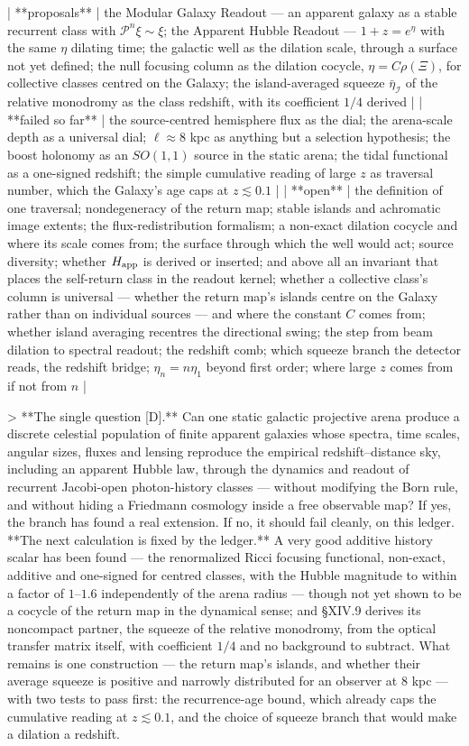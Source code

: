 | **proposals** | the Modular Galaxy Readout — an apparent galaxy as a stable recurrent class with $\mathscr P^n\xi\sim\xi$; the Apparent Hubble Readout — $1+z = e^{\eta}$ with the same $\eta$ dilating time; the galactic well as the dilation scale, through a surface not yet defined; the null focusing column as the dilation cocycle, $\eta = C\rho(\Xi)$, for collective classes centred on the Galaxy; the island-averaged squeeze $\bar\eta_{\mathcal I}$ of the relative monodromy as the class redshift, with its coefficient $1/4$ derived |
| **failed so far** | the source-centred hemisphere flux as the dial; the arena-scale depth as a universal dial; $\ell\approx8$ kpc as anything but a selection hypothesis; the boost holonomy as an $SO(1,1)$ source in the static arena; the tidal functional as a one-signed redshift; the simple cumulative reading of large $z$ as traversal number, which the Galaxy's age caps at $z\lesssim0.1$ |
| **open** | the definition of one traversal; nondegeneracy of the return map; stable islands and achromatic image extents; the flux-redistribution formalism; a non-exact dilation cocycle and where its scale comes from; the surface through which the well would act; source diversity; whether $H_{\rm app}$ is derived or inserted; and above all an invariant that places the self-return class in the readout kernel; whether a collective class's column is universal — whether the return map's islands centre on the Galaxy rather than on individual sources — and where the constant $C$ comes from; whether island averaging recentres the directional swing; the step from beam dilation to spectral readout; the redshift comb; which squeeze branch the detector reads, the redshift bridge; $\eta_n = n\eta_1$ beyond first order; where large $z$ comes from if not from $n$ |

> **The single question [D].** Can one static galactic projective arena produce a discrete celestial population of finite apparent galaxies whose spectra, time scales, angular sizes, fluxes and lensing reproduce the empirical redshift–distance sky, including an apparent Hubble law, through the dynamics and readout of recurrent Jacobi-open photon-history classes — without modifying the Born rule, and without hiding a Friedmann cosmology inside a free observable map? If yes, the branch has found a real extension. If no, it should fail cleanly, on this ledger. **The next calculation is fixed by the ledger.** A very good additive history scalar has been found — the renormalized Ricci focusing functional, non-exact, additive and one-signed for centred classes, with the Hubble magnitude to within a factor of $1$–$1.6$ independently of the arena radius — though not yet shown to be a cocycle of the return map in the dynamical sense; and §XIV.9 derives its noncompact partner, the squeeze of the relative monodromy, from the optical transfer matrix itself, with coefficient $1/4$ and no background to subtract. What remains is one construction — the return map's islands, and whether their average squeeze is positive and narrowly distributed for an observer at $8$ kpc — with two tests to pass first: the recurrence-age bound, which already caps the cumulative reading at $z\lesssim0.1$, and the choice of squeeze branch that would make a dilation a redshift.

